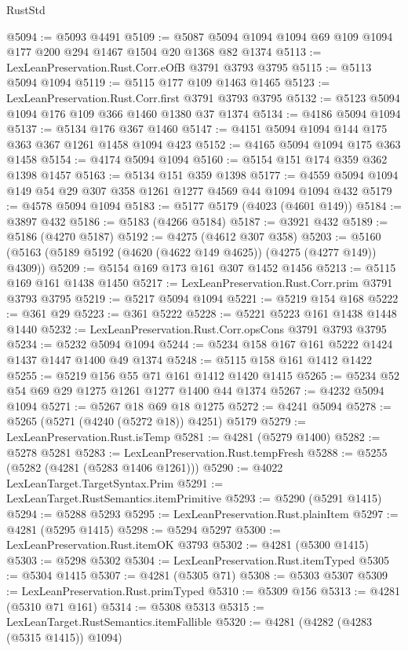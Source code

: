 \begin{lexlean}{RustStd}
\begin{coremodule}
{\begin{coremodule}
{{{{{{{{{{{{{{{{{{{{{{{{{{{{{{{{{{{@5094 := @5093 @4491
@5109 := @5087 @5094 @1094 @1094 @69 @109 @1094 @177 @200 @294 @1467 @1504 @20 @1368 @82 @1374
@5113 := LexLeanPreservation.Rust.Corr.eOfB @3791 @3793 @3795
@5115 := @5113 @5094 @1094
@5119 := @5115 @177 @109 @1463 @1465
@5123 := LexLeanPreservation.Rust.Corr.first @3791 @3793 @3795
@5132 := @5123 @5094 @1094 @176 @109 @366 @1460 @1380 @37 @1374
@5134 := @4186 @5094 @1094
@5137 := @5134 @176 @367 @1460
@5147 := @4151 @5094 @1094 @144 @175 @363 @367 @1261 @1458 @1094 @423
@5152 := @4165 @5094 @1094 @175 @363 @1458
@5154 := @4174 @5094 @1094
@5160 := @5154 @151 @174 @359 @362 @1398 @1457
@5163 := @5134 @151 @359 @1398
@5177 := @4559 @5094 @1094 @149 @54 @29 @307 @358 @1261 @1277 @4569 @44 @1094 @1094 @432
@5179 := @4578 @5094 @1094
@5183 := @5177 @5179 (@4023 (@4601 @149))
@5184 := @3897 @432
@5186 := @5183 (@4266 @5184)
@5187 := @3921 @432
@5189 := @5186 (@4270 @5187)
@5192 := @4275 (@4612 @307 @358)
@5203 := @5160 (@5163 (@5189 @5192 (@4620 (@4622 @149 @4625)) (@4275 (@4277 @149)) @4309))
@5209 := @5154 @169 @173 @161 @307 @1452 @1456
@5213 := @5115 @169 @161 @1438 @1450
@5217 := LexLeanPreservation.Rust.Corr.prim @3791 @3793 @3795
@5219 := @5217 @5094 @1094
@5221 := @5219 @154 @168
@5222 := @361 @29
@5223 := @361 @5222
@5228 := @5221 @5223 @161 @1438 @1448 @1440
@5232 := LexLeanPreservation.Rust.Corr.opsCons @3791 @3793 @3795
@5234 := @5232 @5094 @1094
@5244 := @5234 @158 @167 @161 @5222 @1424 @1437 @1447 @1400 @49 @1374
@5248 := @5115 @158 @161 @1412 @1422
@5255 := @5219 @156 @55 @71 @161 @1412 @1420 @1415
@5265 := @5234 @52 @54 @69 @29 @1275 @1261 @1277 @1400 @44 @1374
@5267 := @4232 @5094 @1094
@5271 := @5267 @18 @69 @18 @1275
@5272 := @4241 @5094
@5278 := @5265 (@5271 (@4240 (@5272 @18)) @4251) @5179
@5279 := LexLeanPreservation.Rust.isTemp
@5281 := @4281 (@5279 @1400)
@5282 := @5278 @5281
@5283 := LexLeanPreservation.Rust.tempFresh
@5288 := @5255 (@5282 (@4281 (@5283 @1406 @1261)))
@5290 := @4022 LexLeanTarget.TargetSyntax.Prim
@5291 := LexLeanTarget.RustSemantics.itemPrimitive
@5293 := @5290 (@5291 @1415)
@5294 := @5288 @5293
@5295 := LexLeanPreservation.Rust.plainItem
@5297 := @4281 (@5295 @1415)
@5298 := @5294 @5297
@5300 := LexLeanPreservation.Rust.itemOK @3793
@5302 := @4281 (@5300 @1415)
@5303 := @5298 @5302
@5304 := LexLeanPreservation.Rust.itemTyped
@5305 := @5304 @1415
@5307 := @4281 (@5305 @71)
@5308 := @5303 @5307
@5309 := LexLeanPreservation.Rust.primTyped
@5310 := @5309 @156
@5313 := @4281 (@5310 @71 @161)
@5314 := @5308 @5313
@5315 := LexLeanTarget.RustSemantics.itemFallible
@5320 := @4281 (@4282 (@4283 (@5315 @1415)) @1094)
}}}}}}}}}}}}}}}}}}}}}}}}}}}}}}}}}}}
\end{coremodule}}
\end{coremodule}
\end{lexlean}
